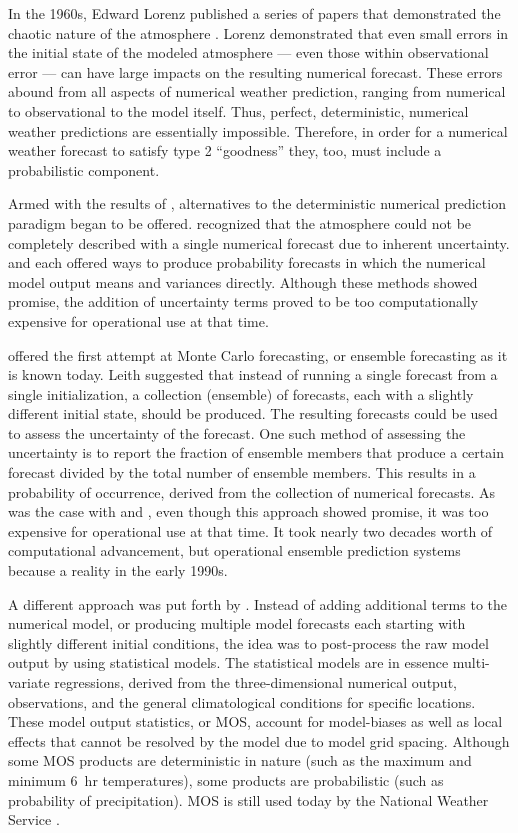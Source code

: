 In the 1960s, Edward Lorenz published a series of papers that demonstrated the chaotic nature of the atmosphere \citep{Lorenz1963, Lorenz1965, Lorenz1968}.
Lorenz demonstrated that even small errors in the initial state of the modeled atmosphere --- even those within observational error --- can have large impacts on the resulting numerical forecast.
These errors abound from all aspects of numerical weather prediction, ranging from numerical to observational to the model itself.
Thus, perfect, deterministic, numerical weather predictions are essentially impossible.
Therefore, in order for a numerical weather forecast to satisfy type 2 ``goodness'' they, too, must include a probabilistic component.


Armed with the results of \cite{Lorenz1963, Lorenz1965, Lorenz1968}, alternatives to the deterministic numerical prediction paradigm began to be offered.
\cite{Epstein1969} recognized that the atmosphere could not be completely described with a single numerical forecast due to inherent uncertainty.
\cite{Epstein1969} and \cite{Gleeson1970} each offered ways to produce probability forecasts in which the numerical model output means and variances directly.
Although these methods showed promise, the addition of uncertainty terms proved to be too computationally expensive for operational use at that time.


\cite{Leith1974} offered the first attempt at Monte Carlo forecasting, or ensemble forecasting as it is known today.
Leith suggested that instead of running a single forecast from a single initialization, a collection (ensemble) of forecasts, each with a slightly different initial state, should be produced.
The resulting forecasts could be used to assess the uncertainty of the forecast.
One such method of assessing the uncertainty is to report the fraction of ensemble members that produce a certain forecast divided by the total number of ensemble members.
This results in a probability of occurrence, derived from the collection of numerical forecasts.
As was the case with \cite{Epstein1969} and \cite{Gleeson1970}, even though this approach showed promise, it was too expensive for operational use at that time.
It took nearly two decades worth of computational advancement, but operational ensemble prediction systems because a reality in the early 1990s.


A different approach was put forth by \cite{Glahn1972}.
Instead of adding additional terms to the numerical model, or producing multiple model forecasts each starting with slightly different initial conditions, the idea was to post-process the raw model output by using statistical models.
The statistical models are in essence multi-variate regressions, derived from the three-dimensional numerical output, observations, and the general climatological conditions for specific locations.
These model output statistics, or MOS, account for model-biases as well as local effects that cannot be resolved by the model due to model grid spacing.
Although some MOS products are deterministic in nature (such as the maximum and minimum \mbox{6 hr} temperatures), some products are probabilistic (such as probability of precipitation).
MOS is still used today by the National Weather Service \citep{Allen2001a, Allen2001b, Sfanos2001, Carroll2005, Glahn2009}.


